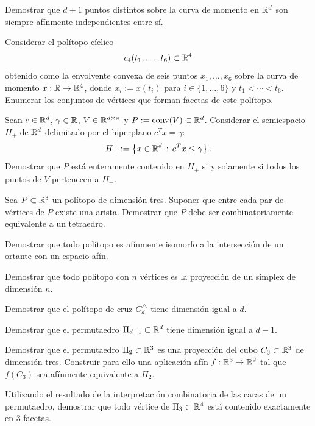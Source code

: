 \documentclass[a4paper,12pt]{article}
\newcommand{\Ppolar}[1]{#1^{\bigtriangleup}}
\renewcommand{\conv}[1]{\mathrm{conv}(#1)}
\begin{document}
\begin{exerciselist}
\item Demostrar que $d + 1$ puntos distintos sobre la curva de momento en $\mathbb{R}^d$ son siempre afínmente independientes entre sí.

\item Considerar el polítopo cíclico 
$$
c_4(t_1, \ldots, t_6) \subset \mathbb{R}^4
$$ 
obtenido como la envolvente convexa de seis puntos $x_1, \ldots, x_6$ sobre la curva de momento $x: \mathbb{R} \to \mathbb{R}^4$, donde $x_i := x(t_i)$ para $i \in \{1, \ldots, 6\}$ y $t_1 < \cdots < t_6$. Enumerar los conjuntos de vértices que forman facetas de este polítopo.

\item Sean $c \in \mathbb{R}^d$, $\gamma \in \mathbb{R}$, $V \in \mathbb{R}^{d \times n}$ y $P := \conv{V} \subset \RR^d$. Considerar el semiespacio $H_+$ de $\mathbb{R}^d$ delimitado por el hiperplano $c^T x = \gamma$:
$$
H_+ := \left\{ x \in \mathbb{R}^d \, : \, c^T x \leq \gamma \right\}.
$$
Demostrar que $P$ está enteramente contenido en $H_+$ si y solamente si todos los puntos de $V$ pertenecen a $H_+$.

\item Sea $P \subset \mathbb{R}^3$ un polítopo de dimensión tres. Suponer que entre cada par de vértices de $P$ existe una arista. Demostrar que $P$ debe ser
combinatoriamente equivalente a un tetraedro.


\item Demostrar que todo polítopo es afínmente isomorfo a la intersección de un ortante con un espacio afín.

\item Demostrar que todo polítopo con $n$ vértices es la proyección de un simplex de dimensión $n$.

\item Demostrar que el polítopo de cruz $\Ppolar{C_d}$ tiene dimensión igual a $d$.

\item Demostrar que el permutaedro $\Pi_{d-1} \subset \mathbb{R}^d$ tiene dimensión igual a $d-1$.

\item Demostrar que el permutaedro $\Pi_2 \subset \mathbb{R}^3$ es una proyección del cubo $C_3 \subset \mathbb{R}^3$ de dimensión tres. Construir para ello una aplicación afín $f: \mathbb{R}^3 \to \mathbb{R}^2$ tal que $f(C_3)$ sea afínmente equivalente a $\Pi_2$.

\item Utilizando el resultado de la interpretación combinatoria de las caras de un permutaedro, demostrar que todo vértice de $\Pi_3 \subset \mathbb{R}^4$ está contenido exactamente en 3 facetas.


\end{exerciselist}
\end{document}
